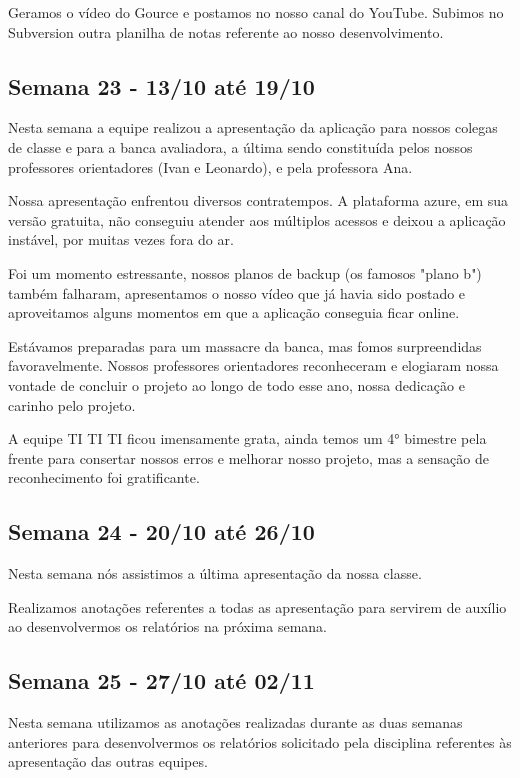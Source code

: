 \begin{apendicesenv}
\begin{flushleft}
Geramos o vídeo do \gls{Gource} e postamos no nosso canal do \gls{YouTube}. Subimos no \gls{Subversion} outra planilha de notas referente ao nosso desenvolvimento.
\end{flushleft}

\begin{flushleft}
 \section{Semana 23 - 13/10 até 19/10}
 Nesta semana a equipe realizou a apresentação da aplicação para nossos colegas de classe e para a banca avaliadora, a última sendo constituída pelos nossos professores orientadores (Ivan e Leonardo), e pela professora Ana.

Nossa apresentação enfrentou diversos contratempos. A plataforma azure, em sua versão gratuita, não conseguiu atender aos múltiplos acessos e deixou a aplicação instável, por muitas vezes fora do ar.

Foi um momento estressante, nossos planos de backup (os famosos "plano b") também falharam, apresentamos o nosso vídeo que já havia sido postado e aproveitamos alguns momentos em que a aplicação conseguia ficar online.

Estávamos preparadas para um massacre da banca, mas fomos surpreendidas favoravelmente. Nossos professores orientadores reconheceram e elogiaram nossa vontade de concluir o projeto ao longo de todo esse ano, nossa dedicação e carinho pelo projeto.

A equipe TI TI TI ficou imensamente grata, ainda temos um 4° bimestre pela frente para consertar nossos erros e melhorar nosso projeto, mas a sensação de reconhecimento foi gratificante.
\end{flushleft}

\begin{flushleft}
 \section{Semana 24 - 20/10 até 26/10}
Nesta semana nós assistimos a última apresentação da nossa classe.

Realizamos anotações referentes a todas as apresentação para servirem de auxílio ao desenvolvermos os relatórios na próxima semana.
\end{flushleft}

\begin{flushleft}
 \section{Semana 25 - 27/10 até 02/11}
Nesta semana utilizamos as anotações realizadas durante as duas semanas anteriores para desenvolvermos os relatórios solicitado pela disciplina referentes às apresentação das outras equipes.


\end{flushleft}
\end{apendicesenv}
